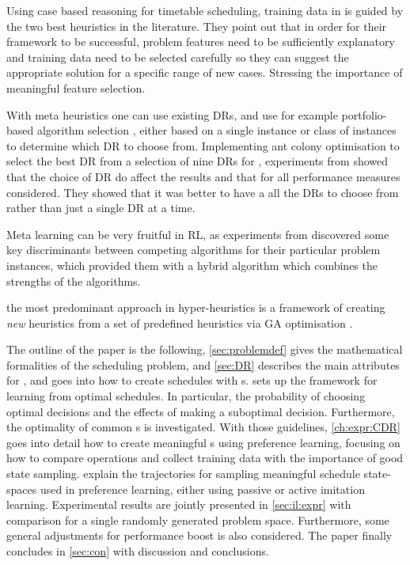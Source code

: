 \documentclass[smallextended]{svjour3}
\begin{document}
	Using case based reasoning for timetable scheduling, training data in 
	\cite{Burke06} is guided by the two best heuristics in the literature.
	They point out that in order for their framework to be successful, problem 
	features need to be sufficiently explanatory and training data need to be 
	selected carefully so they can suggest the appropriate solution for a specific 
	range of new cases. Stressing the importance of meaningful feature selection. 
	
	
	With meta heuristics one can use existing DRs, and use for example 
	portfolio-based algorithm selection \cite{Rice76,Gomes01}, either based on a 
	single instance or class of instances \cite{Xu07} to determine which DR to 
	choose from. 
	Implementing ant colony optimisation to select the best DR 
	from a selection of nine DRs for \JSP, experiments from \cite{Korytkowski13} 
	showed that the choice of DR do affect the results and that for all performance 
	measures considered. They showed that it was better to have a all the DRs to 
	choose from rather than just a single DR at a time.
	
	Meta learning can be very fruitful in RL, as experiments from 
	\cite{Kalyanakrishnan11} discovered some key discriminants between 
	competing algorithms for their particular problem instances, which provided 
	them with a hybrid algorithm which combines the strengths of the algorithms.
	
	
	the most predominant approach in hyper-heuristics is a framework of creating 
	\emph{new} heuristics from a set of  predefined heuristics via GA optimisation 
	\cite{Burke10}. 
	
	
	The outline of the paper is the following, \cref{sec:problemdef} gives the 
	mathematical formalities of the scheduling problem, and  
	\cref{sec:DR} describes the main attributes for \jsp, 
	and goes into how to create schedules with \dr s. 
	 sets up the framework for learning from optimal schedules. 
	In particular, the probability of choosing optimal decisions and the effects of 
	making a suboptimal decision. Furthermore, the optimality of common \sdr s is 
	investigated.
	With those guidelines, \cref{ch:expr:CDR} goes into detail how to create 
	meaningful \cdr s using preference learning, focusing on how to 
	compare operations and collect training data with the importance of good state 
	sampling. 
	 explain the trajectories for 
	sampling meaningful schedule state-spaces used in preference learning, either 
	using passive or active imitation learning. 
	Experimental results are jointly presented in \cref{sec:il:expr} with 
	comparison for a single randomly generated problem space. Furthermore, some 
	general adjustments for performance boost is also considered.
	The paper finally concludes in \cref{sec:con} with discussion and conclusions.
	
\end{document}
